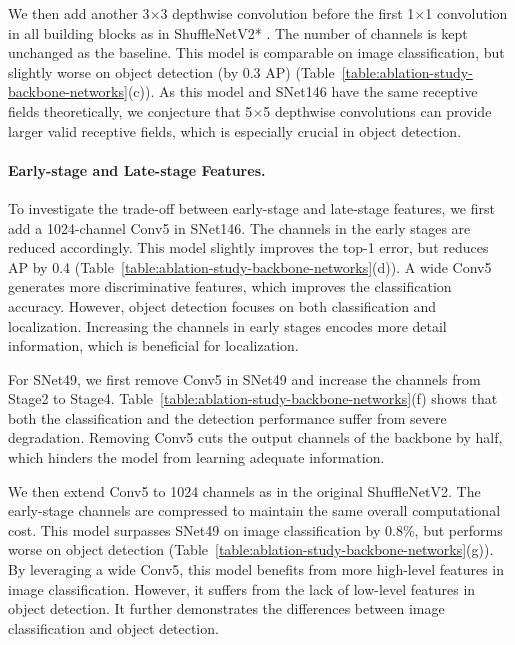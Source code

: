 We then add another 3$\times$3 depthwise convolution before the first 1$\times$1 convolution in all building blocks as in ShuffleNetV2* \cite{ma2018shufflenet}.
The number of channels is kept unchanged as the baseline.
This model is comparable on image classification, but slightly worse on object detection (by 0.3 AP) (Table~\ref{table:ablation-study-backbone-networks}(c)).
As this model and SNet146 have the same receptive fields theoretically, we conjecture that 5$\times$5 depthwise convolutions can provide larger valid receptive fields, which is especially crucial in object detection.

\vspace{-12pt}
\paragraph{Early-stage and Late-stage Features.}

To investigate the trade-off between early-stage and late-stage features, we first add a 1024-channel Conv5 in SNet146.
The channels in the early stages are reduced accordingly.
This model slightly improves the top-1 error, but reduces AP by 0.4 (Table~\ref{table:ablation-study-backbone-networks}(d)).
A wide Conv5 generates more discriminative features, which improves the classification accuracy.
However, object detection focuses on both classification and localization.
Increasing the channels in early stages encodes more detail information, which is beneficial for localization.

For SNet49, we first remove Conv5 in SNet49 and increase the channels from Stage2 to Stage4.
Table~\ref{table:ablation-study-backbone-networks}(f) shows that both the classification and the detection performance suffer from severe degradation.
Removing Conv5 cuts the output channels of the backbone by half, which hinders the model from learning adequate information.

We then extend Conv5 to 1024 channels as in the original ShuffleNetV2.
The early-stage channels are compressed to maintain the same overall computational cost.
This model surpasses SNet49 on image classification by 0.8\%, but performs worse on object detection (Table~\ref{table:ablation-study-backbone-networks}(g)).
By leveraging a wide Conv5, this model benefits from more high-level features in image classification.
However, it suffers from the lack of low-level features in object detection.
It further demonstrates the differences between image classification and object detection.

